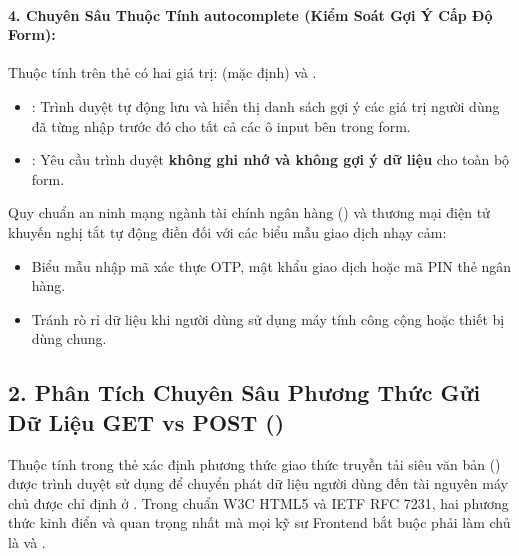 \paragraph{4. Chuyên Sâu Thuộc Tính autocomplete (Kiểm Soát Gợi Ý Cấp Độ Form):}
Thuộc tính  trên thẻ  có hai giá trị:  (mặc định) và .

\begin{itemize}[leftmargin=1.5em, itemsep=3pt, parsep=0pt]
    \item {}: Trình duyệt tự động lưu và hiển thị danh sách gợi ý các giá trị người dùng đã từng nhập trước đó cho tất cả các ô input bên trong form.
    \item {}: Yêu cầu trình duyệt \textbf{không ghi nhớ và không gợi ý dữ liệu} cho toàn bộ form.
\end{itemize}

\begin{warnBox}[Khuyến Cáo Bảo Mật Thực Chiến Đối Với autocomplete="off"]
Quy chuẩn an ninh mạng ngành tài chính ngân hàng () và thương mại điện tử khuyến nghị tắt tự động điền đối với các biểu mẫu giao dịch nhạy cảm:
\begin{itemize}[leftmargin=1.5em, itemsep=2pt, parsep=0pt]
    \item Biểu mẫu nhập mã xác thực OTP, mật khẩu giao dịch hoặc mã PIN thẻ ngân hàng.
    \item Tránh rò rỉ dữ liệu khi người dùng sử dụng máy tính công cộng hoặc thiết bị dùng chung.
\end{itemize}
\end{warnBox}

\subsection{2. Phân Tích Chuyên Sâu Phương Thức Gửi Dữ Liệu GET vs POST ()}
\label{sec:form_methods_get_post}

Thuộc tính  trong thẻ  xác định phương thức giao thức truyền tải siêu văn bản () được trình duyệt sử dụng để chuyển phát dữ liệu người dùng đến tài nguyên máy chủ được chỉ định ở . Trong chuẩn W3C HTML5 và IETF RFC 7231, hai phương thức kinh điển và quan trọng nhất mà mọi kỹ sư Frontend bắt buộc phải làm chủ là  và .

